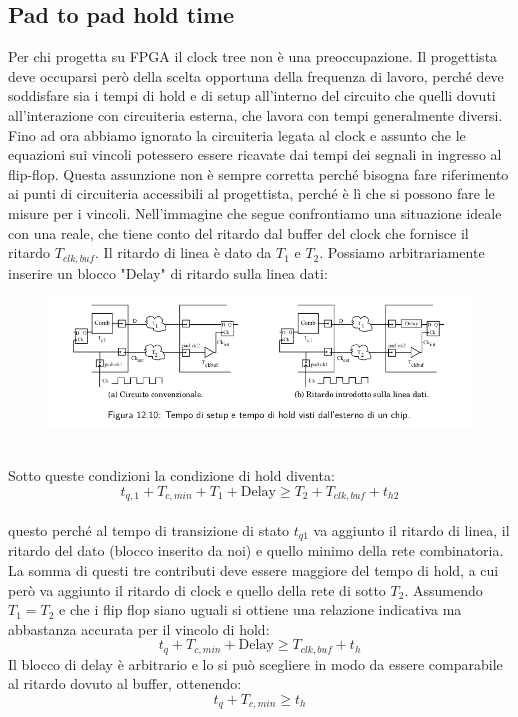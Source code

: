 \documentclass{book}
\begin{document}
        \subsection*{Pad to pad hold time}
            Per chi progetta su FPGA il clock tree non è una preoccupazione. Il progettista deve occuparsi però 
            della scelta opportuna della frequenza di lavoro, perché deve soddisfare sia i tempi di hold e di setup all'interno del circuito 
            che quelli dovuti all'interazione con circuiteria esterna, che lavora con tempi generalmente diversi. \\
            Fino ad ora abbiamo ignorato la circuiteria legata al clock e assunto che le equazioni sui vincoli potessero 
            essere ricavate dai tempi dei segnali in ingresso al flip-flop. Questa assunzione non è sempre corretta perché bisogna fare riferimento 
            ai punti di circuiteria accessibili al progettista, perché è lì che si possono fare le misure per i vincoli.
            Nell'immagine che segue confrontiamo una situazione ideale con una reale, che tiene conto del ritardo  
             dal buffer del clock che fornisce il ritardo $T_{clk, buf}$. Il ritardo di linea è dato da $T_{1}$ e $T_{2}$. Possiamo arbitrariamente inserire
            un blocco "Delay" di ritardo sulla linea dati:
        \begin{figure}[h!]
            \center  
            \includegraphics[width=0.75\linewidth]{img/chapt12img8.png}
        \end{figure} \\
        Sotto queste condizioni la condizione di hold diventa:
        \begin{equation}
            t_{q, 1}+T_{c,min}+T_{1}+\textrm{Delay}\geq T_{2}+T_{clk,buf}+t_{h2}
        \end{equation} \\
        questo perché al tempo di transizione di stato $t_{q1}$ va aggiunto il ritardo di linea, il ritardo del dato (blocco inserito da noi)
        e quello minimo della rete combinatoria. La somma di questi tre contributi deve essere maggiore del tempo di hold,
        a cui però va aggiunto il ritardo di clock e quello della rete di sotto $T_{2}$.
        Assumendo $T_{1}=T_{2}$ e che i flip flop siano uguali si ottiene una relazione indicativa ma abbastanza accurata per il vincolo di hold:
        \begin{equation}
            t_{q}+T_{c,min}+\textrm{Delay} \geq T_{clk, buf}+t_{h}
        \end{equation}
        Il blocco di delay è arbitrario e lo si può scegliere in modo da essere comparabile al ritardo dovuto al buffer, ottenendo:
        \begin{equation}
            t_{q}+T_{c,min} \geq t_{h}
        \end{equation}
\end{document}

